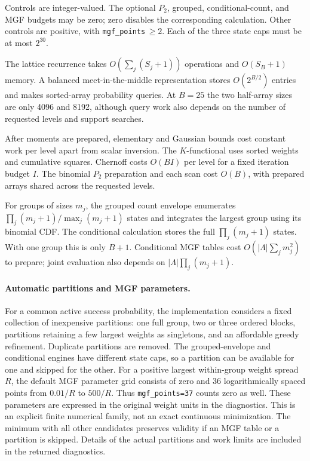 \documentclass[11pt,letterpaper]{article}
\numberwithin{equation}{section}
\theoremstyle{definition}
\theoremstyle{remark}
\begin{document}
Controls are integer-valued. The optional $P_2$, grouped, conditional-count,
and MGF budgets may be zero; zero disables the corresponding calculation.
Other controls are positive, with \texttt{mgf\_points}\,$\ge2$.
Each of the three state caps must be at most $2^{30}$.

The lattice recurrence takes $O(\sum_j(S_j+1))$ operations and
$O(S_B+1)$ memory. A balanced meet-in-the-middle representation stores
$O(2^{B/2})$ entries and makes sorted-array probability queries. At $B=25$
the two half-array sizes are only 4096 and 8192, although query work also
depends on the number of requested levels and support searches.

After moments are prepared, elementary and Gaussian bounds cost constant
work per level apart from scalar inversion. The $K$-functional uses sorted
weights and cumulative squares. Chernoff costs $O(BI)$ per level for a
fixed iteration budget $I$. The binomial $P_2$ preparation and each scan
cost $O(B)$, with prepared arrays shared across the requested levels.

For groups of sizes $m_j$, the grouped count envelope enumerates
$\prod_j(m_j+1)/\max_j(m_j+1)$ states and integrates the largest group
using its binomial CDF. The conditional calculation stores the full
$\prod_j(m_j+1)$ states. With one group this is only $B+1$. Conditional
MGF tables cost $O(|\Lambda|\sum_jm_j^2)$ to prepare; joint evaluation
also depends on $|\Lambda|\prod_j(m_j+1)$.

\paragraph{Automatic partitions and MGF parameters.}
For a common active success probability, the implementation considers a
fixed collection of inexpensive partitions: one full group, two or three
ordered blocks, partitions retaining a few largest weights as singletons,
and an affordable greedy refinement. Duplicate partitions are removed.
The grouped-envelope and conditional engines have different state caps,
so a partition can be available for one and skipped for the other.
For a positive largest within-group weight spread $R$, the default MGF
parameter grid consists of zero and 36 logarithmically spaced points from
$0.01/R$ to $500/R$. Thus \texttt{mgf\_points=37} counts zero as well.
These parameters are expressed in the original weight units in the
diagnostics. This is an explicit finite numerical family, not an exact
continuous minimization.
The minimum with all other candidates preserves validity if an MGF table
or a partition is skipped. Details of the actual partitions and work
limits are included in the returned diagnostics.
\end{document}
